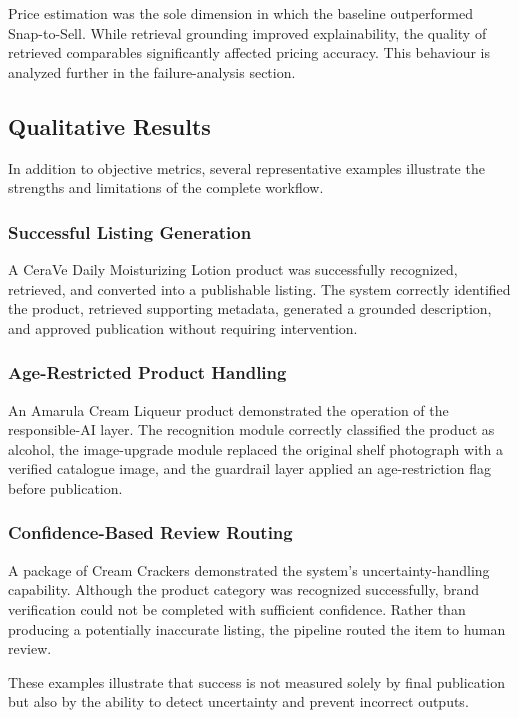 \documentclass[conference]{IEEEtran}
\begin{document}
Price estimation was the sole dimension in which the baseline outperformed
Snap-to-Sell.
While retrieval grounding improved explainability,
the quality of retrieved comparables significantly affected pricing accuracy.
This behaviour is analyzed further in the failure-analysis section. 

\subsection{Qualitative Results}

In addition to objective metrics, several representative examples illustrate
the strengths and limitations of the complete workflow.

\subsubsection{Successful Listing Generation}

A CeraVe Daily Moisturizing Lotion product was successfully recognized,
retrieved, and converted into a publishable listing.
The system correctly identified the product,
retrieved supporting metadata,
generated a grounded description,
and approved publication without requiring intervention. 

\subsubsection{Age-Restricted Product Handling}

An Amarula Cream Liqueur product demonstrated the operation of the
responsible-AI layer.
The recognition module correctly classified the product as alcohol,
the image-upgrade module replaced the original shelf photograph with a
verified catalogue image,
and the guardrail layer applied an age-restriction flag before publication. 

\subsubsection{Confidence-Based Review Routing}

A package of Cream Crackers demonstrated the system's uncertainty-handling
capability.
Although the product category was recognized successfully,
brand verification could not be completed with sufficient confidence.
Rather than producing a potentially inaccurate listing,
the pipeline routed the item to human review. 

These examples illustrate that success is not measured solely by final
publication but also by the ability to detect uncertainty and prevent
incorrect outputs. 
\end{document}
